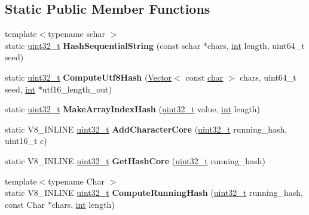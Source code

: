 \subsection*{Static Public Member Functions}
\begin{DoxyCompactItemize}
\item 
\mbox{\label{classv8_1_1internal_1_1StringHasher_a8ce1682b506affaf653204f048e44e6c}} 
{\footnotesize template$<$typename schar $>$ }\\static \mbox{\hyperlink{classuint32__t}{uint32\+\_\+t}} {\bfseries Hash\+Sequential\+String} (const schar $\ast$chars, \mbox{\hyperlink{classint}{int}} length, uint64\+\_\+t seed)
\item 
\mbox{\label{classv8_1_1internal_1_1StringHasher_af91e755b296c8403e53ae124396a1cc4}} 
static \mbox{\hyperlink{classuint32__t}{uint32\+\_\+t}} {\bfseries Compute\+Utf8\+Hash} (\mbox{\hyperlink{classv8_1_1internal_1_1Vector}{Vector}}$<$ const \mbox{\hyperlink{classchar}{char}} $>$ chars, uint64\+\_\+t seed, \mbox{\hyperlink{classint}{int}} $\ast$utf16\+\_\+length\+\_\+out)
\item 
\mbox{\label{classv8_1_1internal_1_1StringHasher_aa478bc40298c8bd5f5478b40fa444c10}} 
static \mbox{\hyperlink{classuint32__t}{uint32\+\_\+t}} {\bfseries Make\+Array\+Index\+Hash} (\mbox{\hyperlink{classuint32__t}{uint32\+\_\+t}} value, \mbox{\hyperlink{classint}{int}} length)
\item 
\mbox{\label{classv8_1_1internal_1_1StringHasher_abc3f0ba847153fed56d52270382691f7}} 
static V8\+\_\+\+I\+N\+L\+I\+NE \mbox{\hyperlink{classuint32__t}{uint32\+\_\+t}} {\bfseries Add\+Character\+Core} (\mbox{\hyperlink{classuint32__t}{uint32\+\_\+t}} running\+\_\+hash, uint16\+\_\+t c)
\item 
\mbox{\label{classv8_1_1internal_1_1StringHasher_a4981020ebc80ed57d1320a6d27ce4949}} 
static V8\+\_\+\+I\+N\+L\+I\+NE \mbox{\hyperlink{classuint32__t}{uint32\+\_\+t}} {\bfseries Get\+Hash\+Core} (\mbox{\hyperlink{classuint32__t}{uint32\+\_\+t}} running\+\_\+hash)
\item 
\mbox{\label{classv8_1_1internal_1_1StringHasher_a94f021f430bdc842088b3e9881cd34e0}} 
{\footnotesize template$<$typename Char $>$ }\\static V8\+\_\+\+I\+N\+L\+I\+NE \mbox{\hyperlink{classuint32__t}{uint32\+\_\+t}} {\bfseries Compute\+Running\+Hash} (\mbox{\hyperlink{classuint32__t}{uint32\+\_\+t}} running\+\_\+hash, const Char $\ast$chars, \mbox{\hyperlink{classint}{int}} length)
\end{DoxyCompactItemize}
